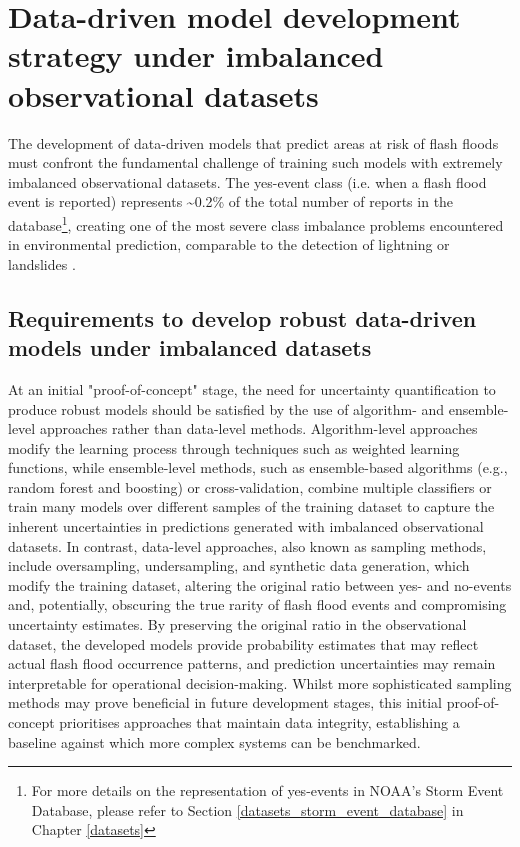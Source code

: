 \section{Data-driven model development strategy 
under imbalanced observational datasets}
\label{integrated_experimental_strategy_model_development_imbalanced_data}

The development of data-driven models that predict areas at risk of flash floods must confront the fundamental challenge of training such models with extremely imbalanced observational datasets. The yes-event class (i.e. when a flash flood event is reported) represents \sim0.2\% of the total number of reports in the database\footnote{For more details on the representation of yes-events in NOAA's Storm Event Database, please refer to Section \ref{datasets_storm_event_database} in Chapter \ref{datasets}}, creating one of the most severe class imbalance problems encountered in environmental prediction, comparable to the detection of lightning \citep{Cavaiola_2024} or landslides \citep{Xu_2022, Agrawal_2017, Zhang_2022, Gupta_2023}. 

\subsection{Requirements to develop robust data-driven models under imbalanced datasets}

At  an initial "proof-of-concept" stage, the need for uncertainty quantification to produce robust models should be satisfied by the use of algorithm- and ensemble-level approaches rather than data-level methods. Algorithm-level approaches modify the learning process through techniques such as weighted learning functions, while ensemble-level methods, such as ensemble-based algorithms (e.g., random forest and boosting) or cross-validation, combine multiple classifiers or train many models over different samples of the training dataset to capture the inherent uncertainties in predictions generated with imbalanced observational datasets. In contrast, data-level approaches, also known as sampling methods, include oversampling, undersampling, and synthetic data generation, which modify the training dataset, altering the original ratio between yes- and no-events and, potentially, obscuring the true rarity of flash flood events and compromising uncertainty estimates. By preserving the original ratio in the observational dataset, the developed models provide probability estimates that may reflect actual flash flood occurrence patterns, and prediction uncertainties may remain interpretable for operational decision-making. Whilst more sophisticated sampling methods may prove beneficial in future development stages, this initial proof-of-concept prioritises approaches that maintain data integrity, establishing a baseline against which more complex systems can be benchmarked.

